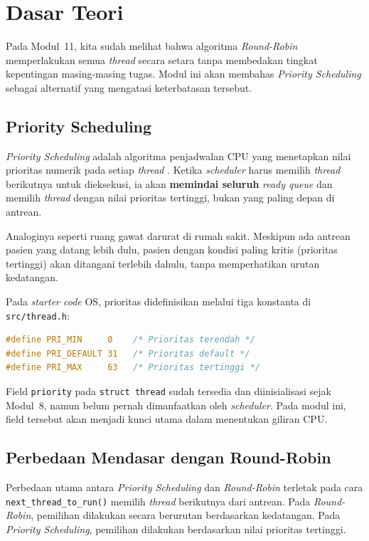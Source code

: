 \newpage
\section{Dasar Teori}

Pada Modul~11, kita sudah melihat bahwa algoritma \textit{Round-Robin} memperlakukan semua \textit{thread} secara setara tanpa membedakan tingkat kepentingan masing-masing tugas. Modul ini akan membahas \textit{Priority Scheduling} sebagai alternatif yang mengatasi keterbatasan tersebut.

\subsection{Priority Scheduling}
\textit{Priority Scheduling} adalah algoritma penjadwalan CPU yang menetapkan nilai prioritas numerik pada setiap \textit{thread} \cite{Silberschatz2018}. Ketika \textit{scheduler} harus memilih \textit{thread} berikutnya untuk dieksekusi, ia akan \textbf{memindai seluruh} \textit{ready queue} dan memilih \textit{thread} dengan nilai prioritas tertinggi, bukan yang paling depan di antrean.

Analoginya seperti ruang gawat darurat di rumah sakit. Meskipun ada antrean pasien yang datang lebih dulu, pasien dengan kondisi paling kritis (prioritas tertinggi) akan ditangani terlebih dahulu, tanpa memperhatikan urutan kedatangan.

Pada \textit{starter code} OS, prioritas didefinisikan melalui tiga konstanta di \texttt{src/thread.h}:

\begin{lstlisting}[language=C, caption={Konstanta prioritas pada thread.h}]
#define PRI_MIN     0    /* Prioritas terendah */
#define PRI_DEFAULT 31   /* Prioritas default */
#define PRI_MAX     63   /* Prioritas tertinggi */
\end{lstlisting}

Field \texttt{priority} pada \texttt{struct thread} sudah tersedia dan diinisialisasi sejak Modul~8, namun belum pernah dimanfaatkan oleh \textit{scheduler}. Pada modul ini, field tersebut akan menjadi kunci utama dalam menentukan giliran CPU.

\subsection{Perbedaan Mendasar dengan Round-Robin}
Perbedaan utama antara \textit{Priority Scheduling} dan \textit{Round-Robin} terletak pada cara \texttt{next\_thread\_to\_run()} memilih \textit{thread} berikutnya dari antrean. Pada \textit{Round-Robin}, pemilihan dilakukan secara berurutan berdasarkan kedatangan. Pada \textit{Priority Scheduling}, pemilihan dilakukan berdasarkan nilai prioritas tertinggi.

